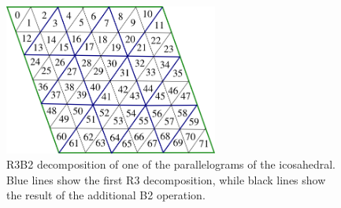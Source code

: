 \documentclass{book}
\begin{document}
\begin{figure}[htb!]
	\begin{center}
		\includegraphics[width=7cm]{fig/IcosahedralGridCells.png}
	\caption{R3B2 decomposition of one of the parallelograms of the icosahedral. Blue lines show the first R3 decomposition, while black lines show the result of the additional B2 operation.}
	\label{fig:IcosahedralCells}
	\end{center}
\end{figure}
\end{document}
